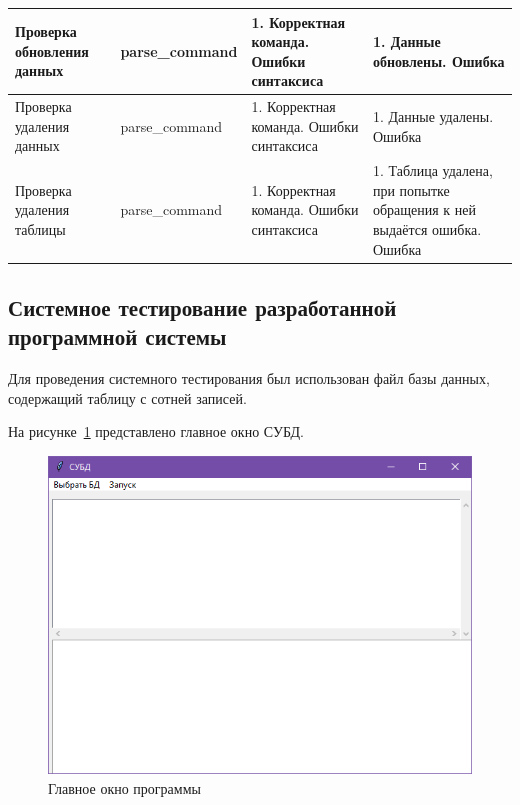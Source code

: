 \begin{xltabular}{\textwidth}{|X|X|X|X|}
	Проверка обновления данных & parse\_command & 1. Корректная команда. Ошибки синтаксиса & 1. Данные обновлены. Ошибка\\ \hline
	Проверка удаления данных & parse\_command & 1. Корректная команда. Ошибки синтаксиса & 1. Данные удалены. Ошибка\\ \hline
	Проверка удаления таблицы & parse\_command & 1. Корректная команда. Ошибки синтаксиса & 1. Таблица удалена, при попытке обращения к ней выдаётся ошибка. Ошибка\\ \hline
\end{xltabular}
\renewcommand{\arraystretch}{1.0}
\vspace{-\baselineskip}

\subsection{Системное тестирование разработанной программной системы}

Для проведения системного тестирования был использован файл базы данных, содержащий таблицу с сотней записей.

На рисунке~\ref{fig:dbms_window} представлено главное окно СУБД.
\begin{figure}[H]
	\centering
	\includegraphics[width=0.9\linewidth]{"images/окно субд"}
	\caption{Главное окно программы}
	\label{fig:dbms_window}
\end{figure}

